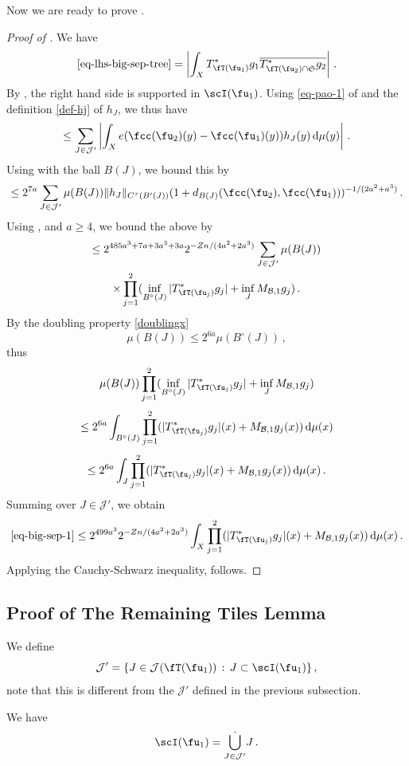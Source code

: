     Now we are ready to prove .
    \begin{proof}[Proof of ]
    \leanok
    We have
    $$
        \eqref{eq-lhs-big-sep-tree} = \left| \int_{X} T_{\fT(\fu_1)}^* g_1 \overline{T_{\fT(\fu_2) \cap \mathfrak{S}}^* g_2 }\right|\,.
    $$
    By , the right hand side is supported in $\scI(\fu_1)$. Using \eqref{eq-pao-1} of  and the definition \eqref{def-hj} of $h_J$, we thus have
    $$
        \le \sum_{J \in \mathcal{J}'} \left|\int_{X} e(\fcc(\fu_2)(y) - \fcc(\fu_1)(y)) h_J(y) \, \mathrm{d}\mu(y) \right|\,.
    $$
    Using  with the ball $B(J)$, we bound this by
    $$
        \le 2^{7a} \sum_{J \in \mathcal{J}'} \mu(B(J)) \|h_J\|_{C^{\tau}(B'(J))} (1 + d_{B(J)}(\fcc(\fu_2), \fcc(\fu_1)))^{-1/(2a^2+a^3)}\,.
    $$
    Using ,  and $a \ge 4$, we bound the above by
    \begin{multline}
        \label{eq-big-sep-1}
        \le 2^{485a^3+7a+3a^3+3a} 2^{-Zn/(4a^2 + 2a^3)} \sum_{J \in \mathcal{J}'} \mu(B(J)) \\
        \times \prod_{j=1}^2 (\inf_{B^\circ{}(J)} |T_{\fT(\fu_j)}^* g_j| + \inf_J M_{\mathcal{B},1} g_j)\,.
    \end{multline}
    By the doubling property \eqref{doublingx}
    $$
        \mu(B(J)) \le 2^{6a} \mu(B^\circ{}(J))\,,
    $$
    thus
    $$
        \mu(B(J)) \prod_{j=1}^2 (\inf_{B^\circ{}(J)} |T_{\fT(\fu_j)}^* g_j| + \inf_J M_{\mathcal{B},1} g_j)
    $$
    $$
        \le 2^{6a} \int_{B^\circ{}(J)} \prod_{j=1}^2 ( |T_{\fT(\fu_j)}^* g_j|(x) + M_{\mathcal{B},1} g_j(x)) \, \mathrm{d}\mu(x)
    $$
    $$
        \le 2^{6a} \int_J \prod_{j=1}^2 ( |T_{\fT(\fu_j)}^* g_j|(x) + M_{\mathcal{B},1} g_j(x)) \, \mathrm{d}\mu(x)\,.
    $$
    Summing over $J \in \mathcal{J}'$, we obtain
    $$
        \eqref{eq-big-sep-1} \le 2^{499a^3} 2^{-Zn/(4a^2 + 2a^3)} \int_X \prod_{j=1}^2 ( |T_{\fT(\fu_j)}^* g_j|(x) + M_{\mathcal{B},1} g_j(x)) \, \mathrm{d}\mu(x)\,.
    $$
    Applying the Cauchy-Schwarz inequality,  follows.
    \end{proof}

\subsection{Proof of The Remaining Tiles Lemma}
    \label{subsec-rest-tiles}
    We define
    $$
        \mathcal{J}' = \{J \in \mathcal{J}(\fT(\fu_1)) \, : \, J \subset \scI(\fu_1)\}\,,
    $$
    note that this is different from the $\mathcal{J}'$ defined in the previous subsection.
    \begin{lemma}
        \label{dyadic-partition-2}
        \leanok
        We have
        $$
            \scI(\fu_1) = \dot{\bigcup_{J \in \mathcal{J}'}} J\,.
        $$
    \end{lemma}

